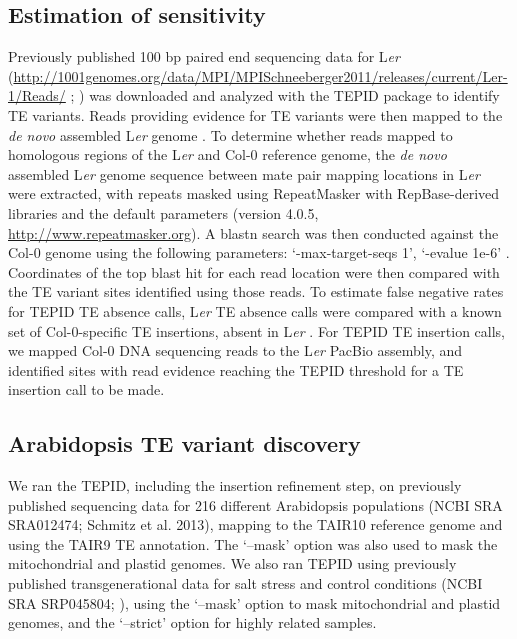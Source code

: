 \documentclass[12pt]{article}
\begin{document}
\subsection{Estimation of sensitivity}

Previously published 100 bp paired end sequencing data for L\emph{er}
(\url{http://1001genomes.org/data/MPI/MPISchneeberger2011/releases/current/Ler-1/Reads/}
; \cite{Schneeberger:2011ft}) was downloaded and analyzed with the TEPID
package to identify TE variants. Reads providing evidence for TE
variants were then mapped to the \emph{de novo} assembled L\emph{er}
genome \cite{Chin:2013iw}. To determine whether reads mapped to
homologous regions of the L\emph{er} and Col-0 reference genome, the
\emph{de novo }assembled L\emph{er }genome sequence between mate pair
mapping locations in L\emph{er} were extracted, with repeats masked
using RepeatMasker with RepBase-derived libraries and the default
parameters (version 4.0.5, \url{http://www.repeatmasker.org}). A blastn
search was then conducted against the Col-0 genome using the following
parameters: `-max-target-seqs 1', `-evalue 1e-6' \cite{Camacho:2009fc}.
Coordinates of the top blast hit for each read location were then
compared with the TE variant sites identified using those reads. To
estimate false negative rates for TEPID TE absence calls, L\emph{er} TE
absence calls were compared with a known set of Col-0-specific TE
insertions, absent in L\emph{er }\cite{Quadrana:2016bi}. For TEPID TE
insertion calls, we mapped Col-0 DNA sequencing reads
\cite{Jiang:2014ih} to the L\emph{er }PacBio assembly, and identified
sites with read evidence reaching the TEPID threshold for a TE insertion
call to be made.

\subsection{Arabidopsis TE variant discovery}

We ran the TEPID, including the insertion refinement step, on previously
published sequencing data for 216 different Arabidopsis populations
(NCBI SRA SRA012474; Schmitz et al. 2013), mapping to the TAIR10
reference genome and using the TAIR9 TE annotation. The `--mask' option
was also used to mask the mitochondrial and plastid genomes. We also ran
TEPID using previously published transgenerational data for salt stress
and control conditions (NCBI SRA SRP045804; \cite{Jiang:2014ih}), using
the `--mask' option to mask mitochondrial and plastid genomes, and the
`--strict' option for highly related samples.
\end{document}
